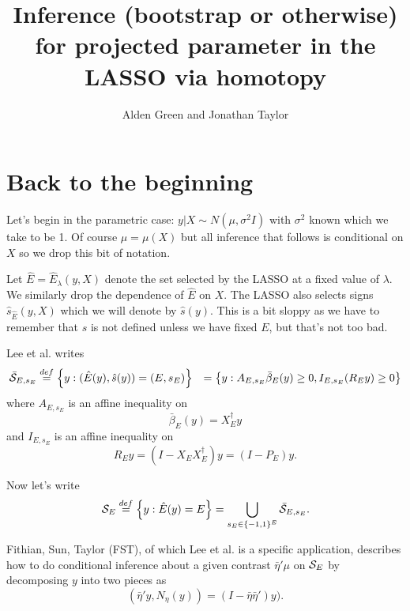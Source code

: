 \documentclass{article}
\title{ {\bf Inference (bootstrap or otherwise)
    for projected parameter in the LASSO via homotopy}}
\author{Alden Green and Jonathan Taylor}
\newcommand{\OLS}{\bar{\beta}}
\begin{document}
	\maketitle
	\RaggedRight

        
        \section{Back to the beginning}

        Let's begin in the parametric case: $y|X \sim N(\mu, \sigma^2
        I)$ with $\sigma^2$ known which we take to be 1. Of course $\mu=\mu(X)$ but all
        inference that follows is conditional on $X$ so we drop this bit of notation.

        Let $\hat{E}=\hat{E}_{\lambda}(y,X)$ denote the set selected by the LASSO at a
        fixed value of $\lambda$. We similarly drop the dependence of $\hat{E}$ on $X$.
        The LASSO also selects signs $\hat{s}_{\hat{E}}(y,X)$ which we will denote
        by $\hat{s}(y)$. This is a bit sloppy as we have to remember that $s$ is not defined
        unless we have fixed $E$, but that's not too bad.
        
        Lee et al. writes
        $$
        \begin{aligned}
        \bar{\cal S}_{E,s_E}
        &\overset{def}{=} \left\{y: (\hat{E}(y),\hat{s}(y))=(E, s_E)\right\}
        &= \left\{y: A_{E,s_E}\OLS_E(y) \geq 0, I_{E,s_E}(R_Ey) \geq 0 \right\}
        \end{aligned}
        $$
        where $A_{E,s_E}$ is an affine inequality on
        $$
        \OLS_E(y) = X_E^{\dagger}y
        $$
        and $I_{E,s_E}$ is an affine inequality on
        $$
        R_Ey = (I - X_EX_E^{\dagger})y=(I-P_E)y.
        $$

        Now let's write
        $$
        {\cal S}_E \overset{def}{=} \left\{y: \hat{E}(y)=E\right\} = \bigcup_{s_E \in \{-1,1\}^E} \bar{\cal S}_{E,s_E}.
        $$

        Fithian, Sun, Taylor (FST), of which Lee et al. is a specific application, describes how to
        do conditional inference about a given contrast $\bar{\eta}'\mu$ on ${\cal S}_E$ by decomposing
        $y$ into two pieces as
        $$
        (\bar{\eta}'y, N_{\eta}(y))=(I - \bar{\eta}\bar{\eta}')y).
        $$
\end{document}
